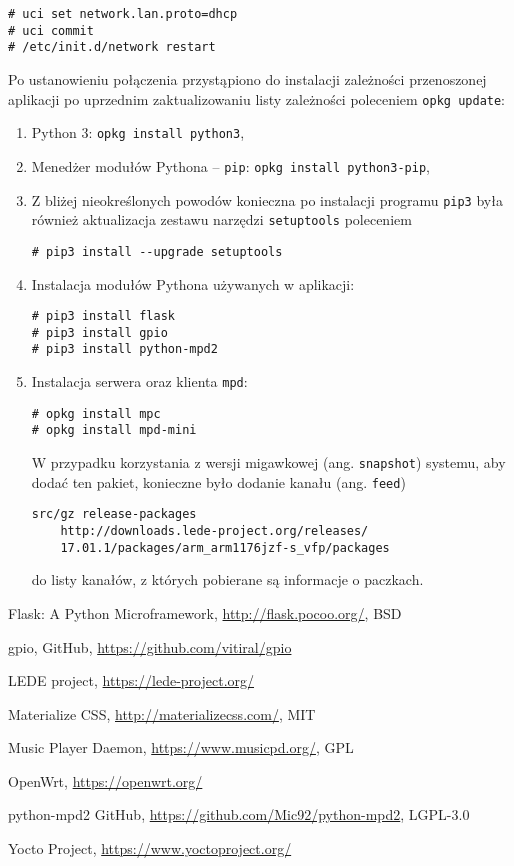 \documentclass[10pt,a4paper]{article}
\begin{document}
\begin{lstlisting}[caption=Włączanie klienta DHCP na interfejsie \texttt{lan}]
# uci set network.lan.proto=dhcp
# uci commit
# /etc/init.d/network restart
\end{lstlisting}

Po ustanowieniu połączenia przystąpiono do instalacji zależności przenoszonej aplikacji po
uprzednim zaktualizowaniu listy zależności poleceniem \texttt{opkg update}:

\begin{enumerate}
	\item Python 3: \texttt{opkg install python3},
	\item Menedżer modułów Pythona -- \texttt{pip}: \texttt{opkg install python3-pip},
	\item Z bliżej nieokreślonych powodów konieczna po instalacji programu \texttt{pip3}
		była również aktualizacja zestawu narzędzi \texttt{setuptools} poleceniem
\begin{lstlisting}
# pip3 install --upgrade setuptools
\end{lstlisting}
	\item Instalacja modułów Pythona używanych w aplikacji:
\begin{lstlisting}
# pip3 install flask
# pip3 install gpio
# pip3 install python-mpd2
\end{lstlisting}
	\item Instalacja serwera oraz klienta \texttt{mpd}:
\begin{lstlisting}
# opkg install mpc
# opkg install mpd-mini
\end{lstlisting}
		W przypadku korzystania z wersji migawkowej (ang. \texttt{snapshot}) systemu, aby
		dodać ten pakiet, konieczne było dodanie kanału (ang. \texttt{feed})
\begin{lstlisting}
src/gz release-packages 
	http://downloads.lede-project.org/releases/
	17.01.1/packages/arm_arm1176jzf-s_vfp/packages
\end{lstlisting}
		do listy kanałów, z których pobierane są informacje o paczkach.
\end{enumerate}


\begin{thebibliography}{9}

		Flask: A Python Microframework,
		\url{http://flask.pocoo.org/},
		BSD

		gpio,
		GitHub,
		\url{https://github.com/vitiral/gpio}

		LEDE project,
		\url{https://lede-project.org/}

		Materialize CSS,
		\url{http://materializecss.com/},
		MIT

		Music Player Daemon,
		\url{https://www.musicpd.org/},
		GPL

		OpenWrt,
		\url{https://openwrt.org/}
	
		python-mpd2
		GitHub,
		\url{https://github.com/Mic92/python-mpd2},
		LGPL-3.0

		Yocto Project,
		\url{https://www.yoctoproject.org/}

\end{thebibliography}
\end{document}
